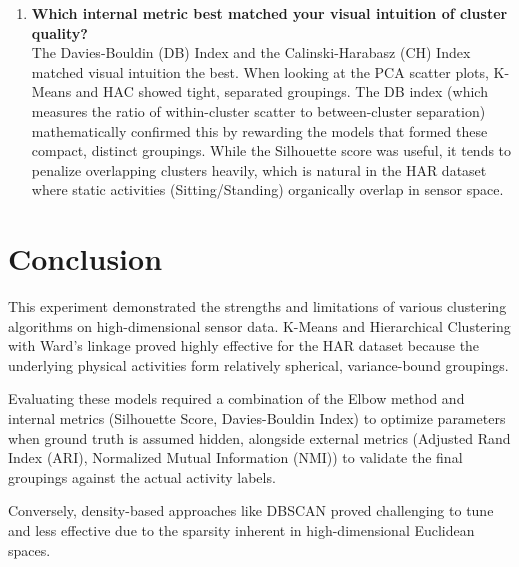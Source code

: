 \documentclass[11pt]{article}
\begin{document}
\begin{enumerate}
\item \textbf{Which internal metric best matched your visual intuition of cluster quality?} \\
The Davies-Bouldin (DB) Index and the Calinski-Harabasz (CH) Index matched visual intuition the best. When looking at the PCA scatter plots, K-Means and HAC showed tight, separated groupings. The DB index (which measures the ratio of within-cluster scatter to between-cluster separation) mathematically confirmed this by rewarding the models that formed these compact, distinct groupings. While the Silhouette score was useful, it tends to penalize overlapping clusters heavily, which is natural in the HAR dataset where static activities (Sitting/Standing) organically overlap in sensor space.

\end{enumerate}

\section*{Conclusion}

This experiment demonstrated the strengths and limitations of various clustering algorithms on high-dimensional sensor data. K-Means and Hierarchical Clustering with Ward's linkage proved highly effective for the HAR dataset because the underlying physical activities form relatively spherical, variance-bound groupings.

Evaluating these models required a combination of the Elbow method and internal metrics (Silhouette Score, Davies-Bouldin Index) to optimize parameters when ground truth is assumed hidden, alongside external metrics (Adjusted Rand Index (ARI), Normalized Mutual Information (NMI)) to validate the final groupings against the actual activity labels.

Conversely, density-based approaches like DBSCAN proved challenging to tune and less effective due to the sparsity inherent in high-dimensional Euclidean spaces.
\end{document}
